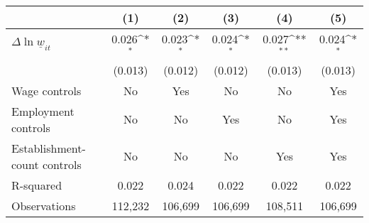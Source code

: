 {
\def\sym#1{\ifmmode^{#1}\else\(^{#1}\)\fi}
\begin{tabular}{l*{5}{c}}
\hline\hline
          &\multicolumn{1}{c}{(1)}         &\multicolumn{1}{c}{(2)}         &\multicolumn{1}{c}{(3)}         &\multicolumn{1}{c}{(4)}         &\multicolumn{1}{c}{(5)}         \\
\hline
$\Delta \ln \underline{w}_{it}$&    0.026\sym{*}  &    0.023\sym{*}  &    0.024\sym{*}  &    0.027\sym{**} &    0.024\sym{*}  \\
          &  (0.013)         &  (0.012)         &  (0.012)         &  (0.013)         &  (0.013)         \\
\hline
Wage controls&       No         &      Yes         &       No         &       No         &      Yes         \\
Employment controls&       No         &       No         &      Yes         &       No         &      Yes         \\
Establishment-count controls&       No         &       No         &       No         &      Yes         &      Yes         \\
R-squared &    0.022         &    0.024         &    0.022         &    0.022         &    0.022         \\
Observations&  112,232         &  106,699         &  106,699         &  108,511         &  106,699         \\
\hline\hline
\end{tabular}
}
